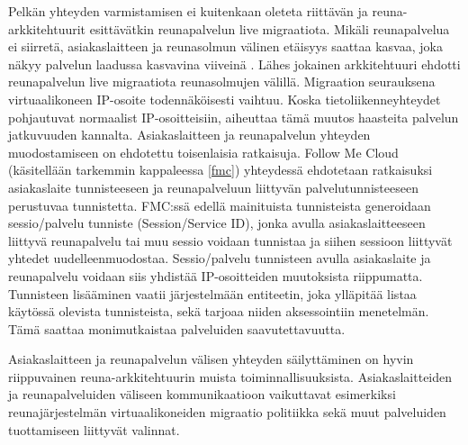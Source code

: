 Pelkän yhteyden varmistamisen ei kuitenkaan oleteta riittävän ja reuna-arkkitehtuurit esittävätkin reunapalvelun live migraatiota.
Mikäli reunapalvelua ei siirretä, asiakaslaitteen ja reunasolmun välinen etäisyys saattaa kasvaa, joka näkyy palvelun laadussa kasvavina viiveinä \cite{taleb2013follow, wang2015mobiscud}.
Lähes jokainen arkkitehtuuri ehdotti reunapalvelun live migraatiota reunasolmujen välillä.
Migraation seurauksena virtuaalikoneen IP-osoite todennäköisesti vaihtuu. Koska tietoliikenneyhteydet pohjautuvat normaalist IP-osoitteisiin, aiheuttaa tämä muutos haasteita palvelun jatkuvuuden kannalta.
Asiakaslaitteen ja reunapalvelun yhteyden muodostamiseen on ehdotettu toisenlaisia ratkaisuja.
Follow Me Cloud (käsitellään tarkemmin kappaleessa \ref{fmc}) yhteydessä ehdotetaan ratkaisuksi asiakaslaite tunnisteeseen ja reunapalveluun liittyvän palvelutunnisteeseen perustuvaa tunnistetta.
FMC:ssä edellä mainituista tunnisteista generoidaan sessio/palvelu tunniste (Session/Service ID), jonka avulla asiakaslaitteeseen liittyvä reunapalvelu tai muu sessio voidaan tunnistaa ja siihen sessioon liittyvät yhtedet uudelleenmuodostaa.
Sessio/palvelu tunnisteen avulla asiakaslaite ja reunapalvelu voidaan siis yhdistää IP-osoitteiden muutoksista riippumatta.
Tunnisteen lisääminen vaatii järjestelmään entiteetin, joka ylläpitää listaa käytössä olevista tunnisteista, sekä tarjoaa niiden aksessointiin menetelmän. Tämä saattaa monimutkaistaa palveluiden saavutettavuutta. 

Asiakaslaitteen ja reunapalvelun välisen yhteyden säilyttäminen on hyvin riippuvainen reuna-arkkitehtuurin muista toiminnallisuuksista. Asiakaslaitteiden ja reunapalveluiden väliseen kommunikaatioon vaikuttavat esimerkiksi reunajärjestelmän virtuaalikoneiden migraatio politiikka sekä muut palveluiden tuottamiseen liittyvät valinnat.








